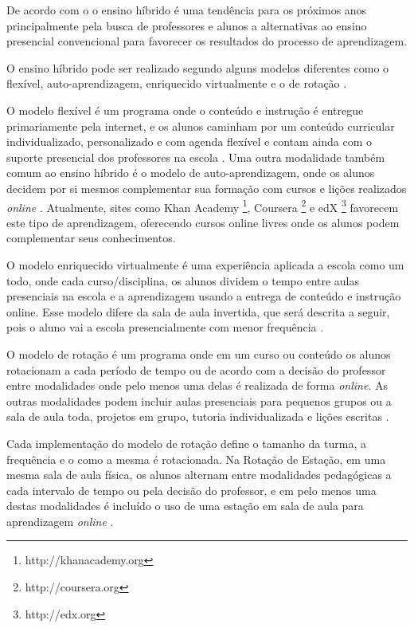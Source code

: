 
De acordo com o  o ensino híbrido é uma tendência para os próximos anos principalmente pela busca de professores e alunos a alternativas ao ensino presencial convencional para favorecer os resultados do processo de aprendizagem.

O ensino híbrido pode ser realizado segundo alguns modelos diferentes como o flexível, auto-aprendizagem, enriquecido virtualmente e o de rotação \cite{staker_classifying_2012}.


O modelo flexível é um programa onde o conteúdo e instrução é entregue primariamente pela internet, e os alunos caminham por um conteúdo curricular individualizado, personalizado e com agenda flexível e contam ainda com o suporte presencial dos professores na escola \cite{staker_classifying_2012}. Uma outra modalidade também comum ao ensino híbrido é o modelo de auto-aprendizagem, onde os alunos decidem por si mesmos complementar sua formação com cursos e lições realizados \emph{online} \cite{horn_rise_2011}. Atualmente, sites como Khan Academy \footnote{http://khanacademy.org}, Coursera \footnote{http://coursera.org} e edX \footnote{http://edx.org} favorecem este tipo de aprendizagem, oferecendo cursos online livres onde os alunos podem complementar seus conhecimentos.

O modelo enriquecido virtualmente é uma experiência aplicada a escola como um todo, onde cada curso/disciplina, os alunos dividem o tempo entre aulas presenciais na escola e a aprendizagem usando a entrega de conteúdo e instrução online. Esse modelo difere da sala de aula invertida, que será descrita a seguir, pois o aluno vai a escola presencialmente com menor frequência \cite{staker_classifying_2012}.


O modelo de rotação é um programa onde em um curso ou conteúdo os alunos rotacionam a cada período de tempo ou de acordo com a decisão do professor entre modalidades onde pelo menos uma delas é realizada de forma \emph{online}. As outras modalidades podem incluir aulas presenciais para pequenos grupos ou a sala de aula toda, projetos em grupo, tutoria individualizada e lições escritas \cite{staker_classifying_2012}.

Cada implementação do modelo de rotação define o tamanho da turma, a frequência e o como a mesma é rotacionada. Na Rotação de Estação, em uma mesma sala de aula física, os alunos alternam entre modalidades pedagógicas a cada intervalo de tempo ou pela decisão do professor, e em pelo menos uma destas modalidades é incluído o uso de uma estação em sala de aula para aprendizagem \emph{online} \cite{staker_classifying_2012}.

